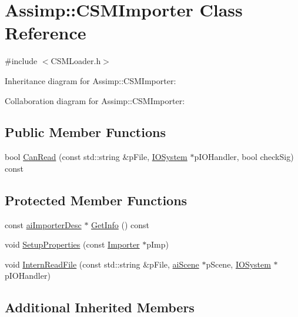 \hypertarget{class_assimp_1_1_c_s_m_importer}{\section{Assimp\+:\+:C\+S\+M\+Importer Class Reference}
\label{class_assimp_1_1_c_s_m_importer}
}


{\ttfamily \#include $<$C\+S\+M\+Loader.\+h$>$}



Inheritance diagram for Assimp\+:\+:C\+S\+M\+Importer\+:


Collaboration diagram for Assimp\+:\+:C\+S\+M\+Importer\+:
\subsection*{Public Member Functions}
\begin{DoxyCompactItemize}
\item 
bool \hyperlink{class_assimp_1_1_c_s_m_importer_adabfef875783b0540a5d95a15b90c9a8}{Can\+Read} (const std\+::string \&p\+File, \hyperlink{class_assimp_1_1_i_o_system}{I\+O\+System} $\ast$p\+I\+O\+Handler, bool check\+Sig) const 
\end{DoxyCompactItemize}
\subsection*{Protected Member Functions}
\begin{DoxyCompactItemize}
\item 
const \hyperlink{structai_importer_desc}{ai\+Importer\+Desc} $\ast$ \hyperlink{class_assimp_1_1_c_s_m_importer_afd60577dd9c2b67f5b3dd4ec41c1b6e0}{Get\+Info} () const 
\item 
void \hyperlink{class_assimp_1_1_c_s_m_importer_a086615f1f4d3496acdd96be7fa32a90e}{Setup\+Properties} (const \hyperlink{class_assimp_1_1_importer}{Importer} $\ast$p\+Imp)
\item 
void \hyperlink{class_assimp_1_1_c_s_m_importer_aa864e9a5bb7cc0a53bc3ca0963fffb78}{Intern\+Read\+File} (const std\+::string \&p\+File, \hyperlink{structai_scene}{ai\+Scene} $\ast$p\+Scene, \hyperlink{class_assimp_1_1_i_o_system}{I\+O\+System} $\ast$p\+I\+O\+Handler)
\end{DoxyCompactItemize}
\subsection*{Additional Inherited Members}


